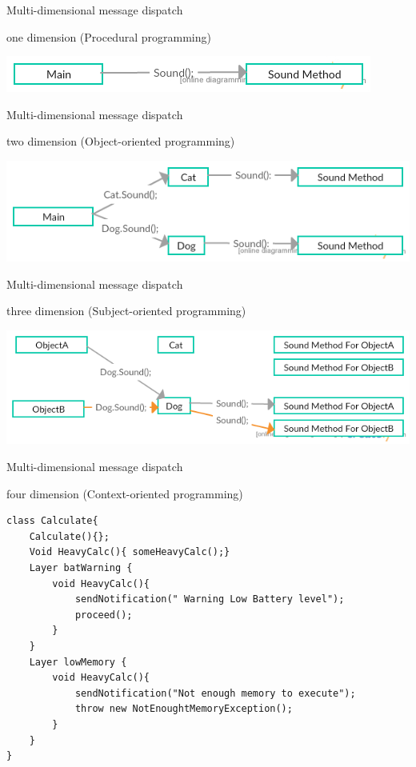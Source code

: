 \documentclass[presentation]{beamer}
\begin{document}
\begin{frame}[label={sec:org7de45c8}]{Multi-dimensional message dispatch}
\begin{block}{one dimension (Procedural programming)}
\begin{center}
\includegraphics[width=.9\linewidth]{./one.jpg}
\end{center}
\end{block}
\end{frame}

\begin{frame}[label={sec:org2ef434c}]{Multi-dimensional message dispatch}
\begin{block}{two dimension (Object-oriented programming)}
\begin{center}
\includegraphics[width=.9\linewidth]{./two.png}
\end{center}
\end{block}
\end{frame}


\begin{frame}[label={sec:orgc1cfd8c}]{Multi-dimensional message dispatch}
\begin{block}{three dimension (Subject-oriented programming)}
\begin{center}
\includegraphics[width=.9\linewidth]{./three.png}
\end{center}
\end{block}
\end{frame}

\begin{frame}[fragile,label={sec:org1906e5f}]{Multi-dimensional message dispatch}
 \begin{block}{four dimension (Context-oriented programming)}
\begin{verbatim}
class Calculate{
    Calculate(){};
    Void HeavyCalc(){ someHeavyCalc();}
    Layer batWarning {
        void HeavyCalc(){
            sendNotification(" Warning Low Battery level");
            proceed();
        }
    }
    Layer lowMemory {
        void HeavyCalc(){
            sendNotification("Not enough memory to execute");
            throw new NotEnoughtMemoryException();
        }
    }
}
\end{verbatim}
\end{block}
\end{frame}
\end{document}
